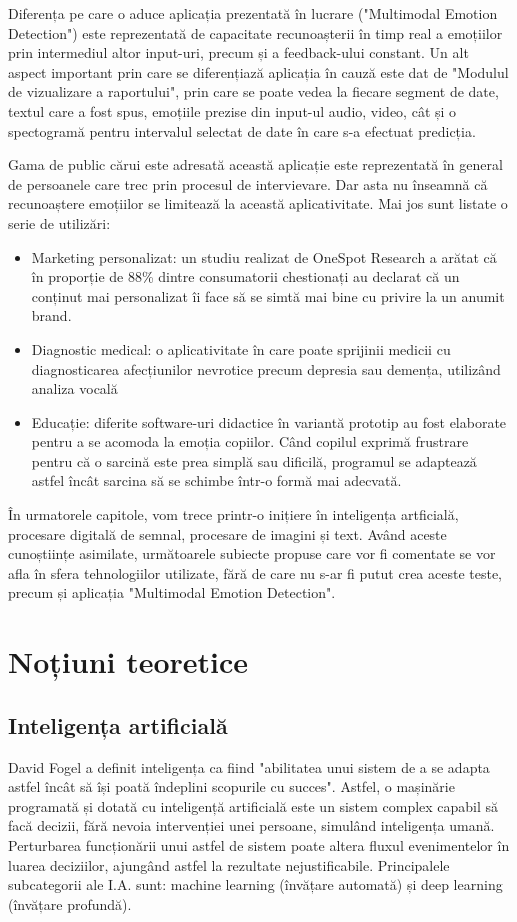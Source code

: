 \documentclass[a4paper, 12pt]{report}
\begin{document}
	Diferența pe care o aduce aplicația prezentată în lucrare ("Multimodal Emotion Detection") este reprezentată de capacitate recunoașterii în timp real a emoțiilor prin intermediul altor input-uri, precum și a feedback-ului constant. Un alt aspect important prin care se diferențiază aplicația în cauză este dat de "Modulul de vizualizare a raportului", prin care se poate vedea la fiecare segment de date, textul care a fost spus, emoțiile prezise din input-ul audio, video, cât și o spectogramă pentru intervalul selectat de date în care s-a efectuat predicția.
	
	Gama de public cărui este adresată această aplicație este reprezentată în general de persoanele care trec prin procesul de intervievare. Dar asta nu înseamnă că recunoaștere emoțiilor se limitează la această aplicativitate. Mai jos sunt listate o serie de utilizări:
	\begin{itemize}
		\item Marketing personalizat: un studiu realizat de OneSpot Research a arătat că în proporție de 88\% dintre consumatorii chestionați au declarat că un conținut mai personalizat îi face să se simtă mai bine cu privire la un anumit brand.
		\item Diagnostic medical: o aplicativitate în care poate sprijinii medicii cu diagnosticarea afecțiunilor nevrotice precum depresia sau demența, utilizând analiza vocală
		\item Educație: diferite software-uri didactice în variantă prototip au fost elaborate pentru a se acomoda la emoția copiilor. Când copilul exprimă frustrare pentru că o sarcină este prea simplă sau dificilă, programul se adaptează astfel încât sarcina să se schimbe într-o formă mai adecvată.
	\end{itemize}
	
	În urmatorele capitole, vom trece printr-o inițiere în inteligența artficială, procesare digitală de semnal, procesare de imagini și text. Având aceste cunoștiințe asimilate, următoarele subiecte propuse care vor fi comentate se vor afla în sfera tehnologiilor utilizate, fără de care nu s-ar fi putut crea aceste teste, precum și aplicația "Multimodal Emotion Detection". 
	\clearpage
	
	\section{Noțiuni teoretice}
	\subsection{Inteligența artificială}
	David Fogel a definit inteligența ca fiind "abilitatea unui sistem de a se adapta astfel încât să își poată îndeplini scopurile cu succes". Astfel, o mașinărie programată și dotată cu inteligență artificială este un sistem complex capabil să facă decizii, fără nevoia intervenției unei persoane, simulând inteligența umană. Perturbarea funcționării unui astfel de sistem poate altera fluxul evenimentelor în luarea deciziilor, ajungând astfel la rezultate nejustificabile. Principalele subcategorii ale I.A. sunt: machine learning (învățare automată) și deep learning (învățare profundă).
		
\end{document}
